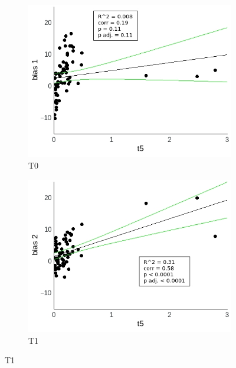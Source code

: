 \documentclass[a4paper]{scrreprt}
\begin{document}
\begin{figure}
\centering
\begin{subfigure}[b]{0.49\textwidth}
        \includegraphics[width=\textwidth]{figs/sec3/t5/t5_diff_1_mod1mod1.jpeg}
        \caption{T0}
    \end{subfigure}
    \begin{subfigure}[b]{0.49\textwidth}
        \includegraphics[width=\textwidth]{figs/sec3/t5/t5_diff_2_mod1mod1.jpeg}
        \caption{T1}
    \end{subfigure}


\end{figure}
\end{document}
